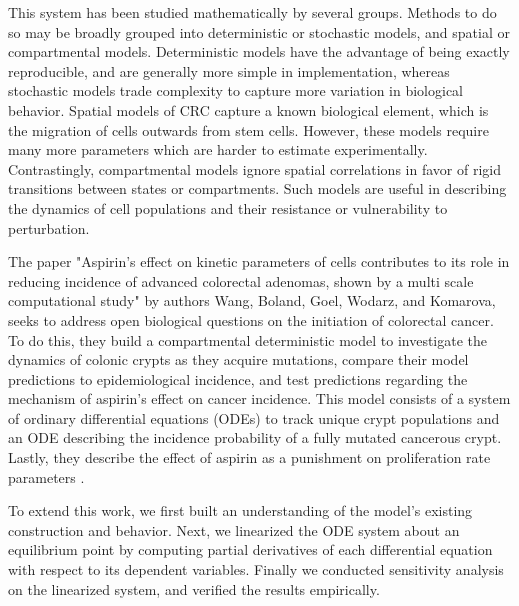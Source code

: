 This system has been studied mathematically by several groups. Methods to do so may be broadly grouped into deterministic or stochastic models, and spatial or compartmental models. \autocite{StochasticModel} Deterministic models have the advantage of being exactly reproducible, and are generally more simple in implementation, whereas stochastic models trade complexity to capture more variation in biological behavior. Spatial models of CRC capture a known biological element, which is the migration of cells outwards from stem cells. However, these models require many more parameters which are harder to estimate experimentally. Contrastingly, compartmental models ignore spatial correlations in favor of rigid transitions between states or compartments. Such models are useful in describing the dynamics of cell populations and their resistance or vulnerability to perturbation. 

The paper "Aspirin’s effect on kinetic parameters of cells contributes to its role in reducing incidence of advanced colorectal adenomas, shown by a multi scale computational study" by authors Wang, Boland, Goel, Wodarz, and Komarova, seeks to address open biological questions on the initiation of colorectal cancer. To do this, they build a compartmental deterministic model to investigate the dynamics of colonic crypts as they acquire mutations, compare their model predictions to epidemiological incidence, and test predictions regarding the mechanism of aspirin's effect on cancer incidence. This model consists of a system of ordinary differential equations (ODEs) to track unique crypt populations and an ODE describing the incidence probability of a fully mutated cancerous crypt. Lastly, they describe the effect of aspirin as a punishment on proliferation rate parameters \autocite{AspirinsEffect}.

To extend this work, we first built an understanding of the model's existing construction and behavior. Next, we linearized the ODE system about an equilibrium point by computing partial derivatives of each differential equation with respect to its dependent variables. Finally we conducted sensitivity analysis on the linearized system, and verified the results empirically. 

